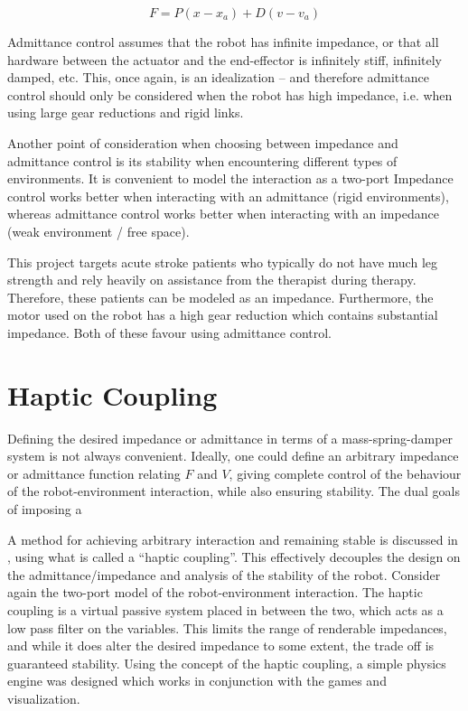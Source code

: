 \documentclass[12pt]{report}
\begin{document}
	\begin{equation} \label{eqn:PD}
	F = P(x - x_a) + D(v - v_a)
	\end{equation}

	Admittance control assumes that the robot has infinite impedance, or that all hardware between the actuator and the end-effector is infinitely stiff, infinitely damped, etc. This, once again, is an idealization -- and therefore admittance control should only be considered when the robot has high impedance, i.e. when using large gear reductions and rigid links. 
	
	Another point of consideration when choosing between impedance and admittance control is its stability when encountering different types of environments. It is convenient to model the interaction as a two-port
	Impedance control works better when interacting with an admittance (rigid environments), whereas admittance control works better when interacting with an impedance (weak environment / free space). 
	
	This project targets acute stroke patients who typically do not have much leg strength and rely heavily on assistance from the therapist during therapy. Therefore, these patients can be modeled as an impedance. Furthermore, the motor used on the robot has a high gear reduction which contains substantial impedance. Both of these favour using admittance control. 
	
	

	\section{Haptic Coupling}
%

Defining the desired impedance or admittance in terms of a mass-spring-damper system is not always convenient. Ideally, one could define an arbitrary impedance or admittance function relating $F$ and $V$, giving complete control of the behaviour of the robot-environment interaction, while also ensuring stability. The dual goals of imposing a 
	
	A method for achieving arbitrary interaction and remaining stable is discussed in \cite{Adams1999}, using what is called a ``haptic coupling''. This effectively decouples the design on the admittance/impedance and analysis of the stability of the robot. Consider again the two-port model of the robot-environment interaction. The haptic coupling is a virtual passive system placed in between the two, which acts as a low pass filter on the variables. This limits the range of renderable impedances, and while it does alter the desired impedance to some extent, the trade off is guaranteed stability. Using the concept of the haptic coupling, a simple physics engine was designed which works in conjunction with the games and visualization. 
	
\end{document}
